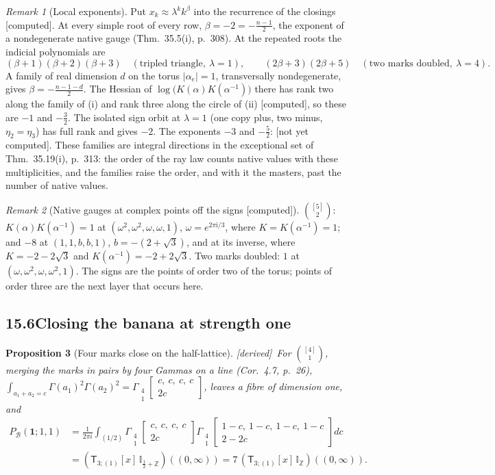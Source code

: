 \documentclass[11pt]{article}
\newcommand{\cB}{\mathcal B}
\newcommand{\one}{\mathbf 1}
\newcommand{\sT}{\mathsf T}
\newcommand{\Gst}[4]{\Gamma_{\substack{#1\\#2}}\!\begin{bmatrix}#3\\#4\end{bmatrix}}
\newcommand{\IZ}{\mathbb I_{\mathbb Z}}
\newcommand{\Ilat}[1]{\mathbb I_{#1}}
\newcommand{\Tx}[3]{(\sT_{#1;(1)}[x]\,#2)((#3,\infty))}
\theoremstyle{plain}
\newtheorem{proposition}{Proposition}[section]
\theoremstyle{definition}
\theoremstyle{remark}
\newtheorem{remark}[proposition]{Remark}
\newcommand{\derived}{\textup{[derived]}}
\newcommand{\computed}{\textup{[computed]}}
\newcommand{\notyet}{\textup{[not yet computed]}}
\begin{document}
\begin{remark}[Local exponents]\label{a:auto:15.16}
Put $x_k\approx\lambda^kk^\beta$ into the recurrence of the closings \computed. At every simple root of every row, $\beta=-2=-\frac{n-1}2$, the exponent of a nondegenerate native gauge (Thm.~35.5(i), p.~308). At the repeated roots the indicial polynomials are
\[
(\beta+1)(\beta+2)(\beta+3)\quad(\text{tripled triangle},\ \lambda=1),\qquad(2\beta+3)(2\beta+5)\quad(\text{two marks doubled},\ \lambda=4).
\]
A family of real dimension $d$ on the torus $|\alpha_e|=1$, transversally nondegenerate, gives $\beta=-\frac{n-1-d}2$. The Hessian of $\log\big(K(\alpha)K(\alpha^{-1})\big)$ there has rank two along the family of (i) and rank three along the circle of (ii) \computed, so these are $-1$ and $-\frac32$. The isolated sign orbit at $\lambda=1$ (one copy plus, two minus, $\eta_2=\eta_3$) has full rank and gives $-2$. The exponents $-3$ and $-\frac52$: \notyet. These families are integral directions in the exceptional set of Thm.~35.19(i), p.~313: the order of the ray law counts native values with these multiplicities, and the families raise the order, and with it the masters, past the number of native values.
\end{remark}

\begin{remark}[Native gauges at complex points off the signs \computed]\label{a:auto:15.17}
$\binom{[5]}2$: $K(\alpha)K(\alpha^{-1})=1$ at $(\omega^2,\omega^2,\omega,\omega,1)$, $\omega=e^{2\pi\mathrm i/3}$, where $K=K(\alpha^{-1})=1$; and $-8$ at $(1,1,b,b,1)$, $b=-(2+\sqrt3)$, and at its inverse, where $K=-2-2\sqrt3$ and $K(\alpha^{-1})=-2+2\sqrt3$. Two marks doubled: $1$ at $(\omega,\omega^2,\omega,\omega^2,1)$. The signs are the points of order two of the torus; points of order three are the next layer that occurs here.
\end{remark}

\subsection*{15.6\quad Closing the banana at strength one}

\begin{proposition}[Four marks close on the half-lattice]\label{a:p:fourclose}\derived\
For $\binom{[4]}1$, merging the marks in pairs by four Gammas on a line (Cor.~4.7, p.~26), $\int_{a_1+a_2=c}\Gamma(a_1)^2\Gamma(a_2)^2=\Gst41{c,\ c,\ c,\ c}{2c}$, leaves a fibre of dimension one, and
\begin{align*}
P_{\cB}(\one;1,1)&=\frac1{2\pi i}\int_{(1/2)}\Gst41{c,\ c,\ c,\ c}{2c}\Gst41{1-c,\ 1-c,\ 1-c,\ 1-c}{2-2c}dc\\
&=\Tx{3}{\Ilat{\frac12+\mathbb Z}}{0}=7\,\Tx{3}{\IZ}{0}.
\end{align*}
\end{proposition}
\end{document}
